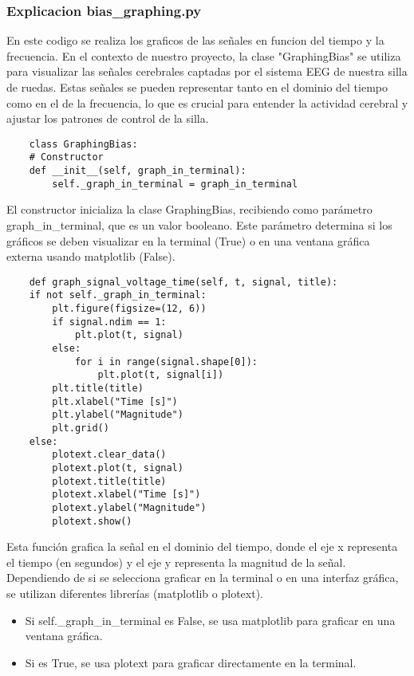 \documentclass{article}
\begin{document}
\subsubsection{Explicacion bias\_graphing.py}
En este codigo se realiza los graficos de las señales en funcion del tiempo y la frecuencia. En el contexto de nuestro proyecto, la clase "GraphingBias" se utiliza para visualizar las señales cerebrales captadas por el sistema EEG de nuestra silla de ruedas. Estas señales se pueden representar tanto en el dominio del tiempo como en el de la frecuencia, lo que es crucial para entender la actividad cerebral y ajustar los patrones de control de la silla.

\begin{lstlisting}
    class GraphingBias:
    # Constructor
    def __init__(self, graph_in_terminal):
        self._graph_in_terminal = graph_in_terminal
\end{lstlisting}
El constructor inicializa la clase GraphingBias, recibiendo como parámetro graph\_in\_terminal, que es un valor booleano. Este parámetro determina si los gráficos se deben visualizar en la terminal (True) o en una ventana gráfica externa usando matplotlib (False).
\begin{lstlisting}
    def graph_signal_voltage_time(self, t, signal, title):
    if not self._graph_in_terminal:
        plt.figure(figsize=(12, 6))
        if signal.ndim == 1:
            plt.plot(t, signal)
        else:
            for i in range(signal.shape[0]):
                plt.plot(t, signal[i])
        plt.title(title)
        plt.xlabel("Time [s]")
        plt.ylabel("Magnitude")
        plt.grid()
    else:
        plotext.clear_data()
        plotext.plot(t, signal)
        plotext.title(title)
        plotext.xlabel("Time [s]")
        plotext.ylabel("Magnitude")
        plotext.show()
\end{lstlisting}
Esta función grafica la señal en el dominio del tiempo, donde el eje x representa el tiempo (en segundos) y el eje y representa la magnitud de la señal. Dependiendo de si se selecciona graficar en la terminal o en una interfaz gráfica, se utilizan diferentes librerías (matplotlib o plotext).
\begin{itemize}
    \item Si self.\_graph\_in\_terminal es False, se usa matplotlib para graficar en una ventana gráfica.
    \item Si es True, se usa plotext para graficar directamente en la terminal.
\end{itemize}
\end{document}
